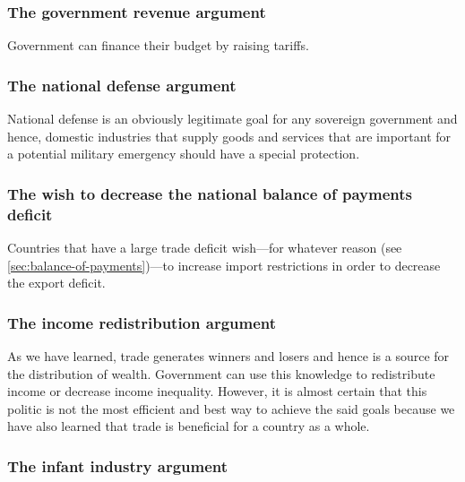 \subsubsection*{The government revenue argument}
Government can finance their budget by raising tariffs.

\subsubsection*{The national defense argument}
National defense is an obviously legitimate goal for any sovereign government and hence, domestic industries that supply goods and services that are important for a potential military emergency should have a special protection.

\subsubsection*{The wish to decrease the national balance of payments deficit}
Countries that have a large trade deficit wish---for whatever reason (see \autoref{sec:balance-of-payments})---to increase import restrictions in order to decrease the export deficit.

\subsubsection*{The income redistribution argument}
As we have learned, trade generates winners and losers and hence is a source for the distribution of wealth. Government can use this knowledge to redistribute income or decrease income inequality. However, it is almost certain that this politic is not the most efficient and best way to achieve the said goals because we have also learned that trade is beneficial for a country as a whole.

\subsubsection*{The infant industry argument}

